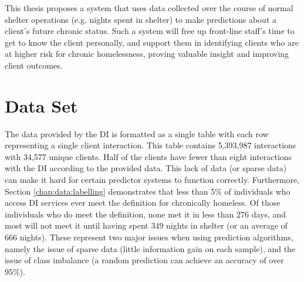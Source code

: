 This thesis proposes a system that uses data collected over the course of normal shelter operations (e.g. nights spent in shelter) to make predictions about a client's future chronic status.
Such a system will free up front-line staff's time to get to know the client personally, and support them in identifying clients who are at higher risk for chronic homelessness, proving valuable insight and improving client outcomes.


\section{Data Set} \label{chap:intro:data}

The data provided by the DI is formatted as a single table with each row representing a single client interaction. This table contains 5,393,987 interactions with 34,577 unique clients.
Half of the clients have fewer than eight interactions with the DI according to the provided data. This lack of data (or sparse data) can make it hard for certain predictor systems to function correctly.
Furthermore, Section \ref{chap:data:labelling} demonstrates that less than 5\% of individuals who access DI services ever meet the definition for chronically homeless. 
Of those individuals who do meet the definition, none met it in less than 276 days, and most will not meet it until having spent 349 nights in shelter (or an average of 666 nights).
These represent two major issues when using prediction algorithms, namely the issue of sparse data (little information gain on each sample), and the issue of class imbalance (a random prediction can achieve an accuracy of over 95\%).


